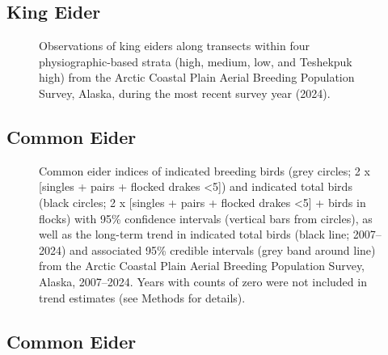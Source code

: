 \documentclass[
]{article}
\begin{document}
\endgroup{}

\newpage{}

\subsection*{King Eider}\label{king-eider-2}

\begin{figure}


\caption{\label{fig-KIEImap}Observations of king eiders along transects
within four physiographic-based strata (high, medium, low, and Teshekpuk
high) from the Arctic Coastal Plain Aerial Breeding Population Survey,
Alaska, during the most recent survey year (2024).}

\end{figure}%

\newpage{}

\subsection*{Common Eider}\label{common-eider}

\begin{figure}


\caption{\label{fig-COEI}Common eider indices of indicated breeding
birds (grey circles; 2 x {[}singles + pairs + flocked drakes
\textless5{]}) and indicated total birds (black circles; 2 x {[}singles
+ pairs + flocked drakes \textless5{]} + birds in flocks) with 95\%
confidence intervals (vertical bars from circles), as well as the
long-term trend in indicated total birds (black line; 2007--2024) and
associated 95\% credible intervals (grey band around line) from the
Arctic Coastal Plain Aerial Breeding Population Survey, Alaska,
2007--2024. Years with counts of zero were not included in trend
estimates (see Methods for details).}

\end{figure}%

\newpage{}

\subsection*{Common Eider}\label{common-eider-1}
\end{document}
